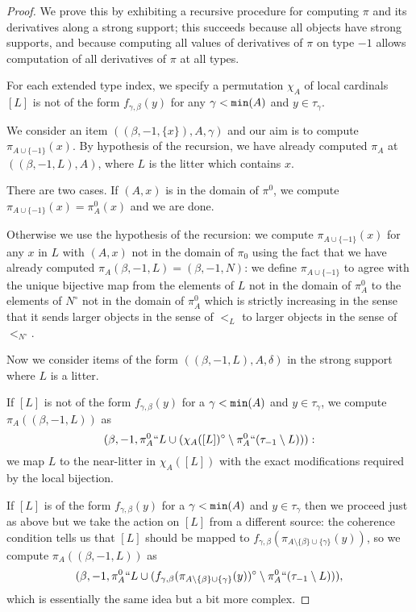 \begin{description}
\begin{proof}
We prove this by exhibiting a recursive procedure for computing $\pi$ and its derivatives along a strong support;  this succeeds because all objects have strong supports, and because computing all values of derivatives of $\pi$ on type $-1$ allows computation of all derivatives of $\pi$ at all types.

For each extended type index, we specify a permutation $\chi_A$ of local cardinals $[L]$ is not of the form $f_{\gamma,\beta}(y)$ for any $\gamma<{\tt min}(A)$ and $y \in \tau_\gamma$.

We consider an item $((\beta,-1,\{x\}),A,\gamma)$ and our aim is to compute $\pi_{A \cup \{-1\}}(x)$.  By hypothesis of the recursion, we have already
computed $\pi_A$ at $((\beta,-1,L),A)$, where $L$ is the litter which contains $x$.

There are two cases.  If $(A,x)$ is in the domain of $\pi^0$, we compute $\pi_{A \cup \{-1\}}(x) = \pi^0_A(x)$ and we are done.

Otherwise we use the hypothesis of the recursion:  we compute $\pi_{A \cup \{-1\}}(x)$ for any $x$ in $L$ with $(A,x)$ not in the domain of $\pi_0$ using the fact that we have already computed $\pi_A(\beta,-1,L) = (\beta,-1,N)$:  we define $\pi_{A \cup \{-1\}}$ to agree with the unique bijective map from the
elements of $L$ not in the domain of $\pi^0_A$ to the elements of $N^\circ$ not in the domain of $\pi^0_A$ which is strictly increasing in the sense that it sends larger objects in the sense of $<_L$ to larger objects in the sense of $<_{N^\circ}$.

Now we consider items of the form $((\beta,-1,L),A,\delta)$ in the strong support where $L$ is a litter.

If $[L]$ is not of the form $f_{\gamma,\beta}(y)$ for a $\gamma<{\tt min}(A)$ and $y \in \tau_\gamma$,
we compute $\pi_A((\beta,-1,L))$ as $$(\beta,-1,{\pi^0_A}``L \cup (\chi_A([L])^\circ \setminus {\pi^0_A}``(\tau_{-1} \setminus L))):$$ we map
$L$ to the near-litter in $\chi_A([L])$ with the exact modifications required by the local bijection.

If $[L]$ is of the form $f_{\gamma,\beta}(y)$ for a $\gamma<{\tt min}(A)$ and $y \in \tau_\gamma$ then we proceed just as above but we take the action on $[L]$ from a different source:
the coherence condition tells us that $[L]$ should be mapped to $f_{\gamma,\beta}(\pi_{A \setminus \{\beta\} \cup \{\gamma\}}(y))$, so we compute
$\pi_A((\beta,-1,L))$ as $$(\beta,-1,{\pi^0_A}``L \cup (f_{\gamma,\beta}(\pi_{A \setminus \{\beta\} \cup \{\gamma\}}(y))^\circ \setminus {\pi^0_A}``(\tau_{-1}\setminus L))),$$  which is essentially the same idea but a bit more complex.


\end{proof}
\end{description}
